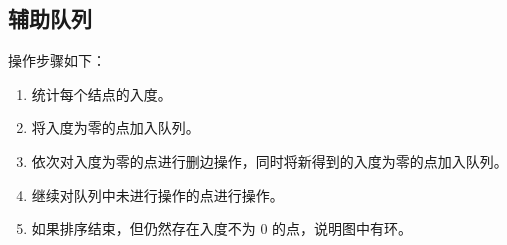 \subsection{辅助队列}
	操作步骤如下：
	
	\begin{enumerate}
		\item 统计每个结点的入度。
		\item 将入度为零的点加入队列。
		\item 依次对入度为零的点进行删边操作，同时将新得到的入度为零的点加入队列。
		\item 继续对队列中未进行操作的点进行操作。
		\item 如果排序结束，但仍然存在入度不为 0 的点，说明图中有环。
	\end{enumerate}
	
	